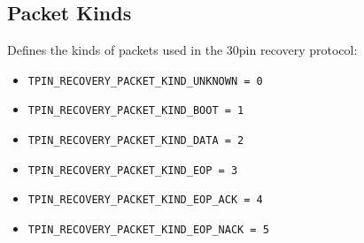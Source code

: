 \documentclass{article}
\begin{document}
\subsection{Packet Kinds}
Defines the kinds of packets used in the 30pin recovery protocol:

\begin{itemize}[leftmargin=2em]
    \item \texttt{TPIN\_RECOVERY\_PACKET\_KIND\_UNKNOWN = 0}
    \item \texttt{TPIN\_RECOVERY\_PACKET\_KIND\_BOOT = 1}
    \item \texttt{TPIN\_RECOVERY\_PACKET\_KIND\_DATA = 2}
    \item \texttt{TPIN\_RECOVERY\_PACKET\_KIND\_EOP = 3}
    \item \texttt{TPIN\_RECOVERY\_PACKET\_KIND\_EOP\_ACK = 4}
    \item \texttt{TPIN\_RECOVERY\_PACKET\_KIND\_EOP\_NACK = 5}
\end{itemize}
\end{document}
